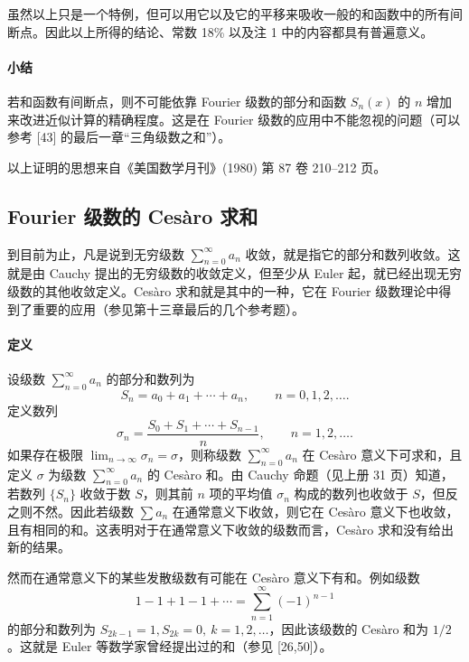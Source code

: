 \begin{xremark}
虽然以上只是一个特例，但可以用它以及它的平移来吸收一般的和函数中的所有间断点。因此以上所得的结论、常数 18\% 以及注 1 中的内容都具有普遍意义。
\end{xremark}

\paragraph{小结}
若和函数有间断点，则不可能依靠 Fourier 级数的部分和函数 $S_n(x)$ 的 $n$ 增加来改进近似计算的精确程度。这是在 Fourier 级数的应用中不能忽视的问题（可以参考 [43] 的最后一章“三角级数之和”）。

\begin{xremark}
以上证明的思想来自《美国数学月刊》(1980) 第 87 卷 210--212 页。
\end{xremark}

\subsection{Fourier 级数的 Cesàro 求和}

到目前为止，凡是说到无穷级数 $\sum_{n=0}^{\infty}a_n$ 收敛，就是指它的部分和数列收敛。这就是由 Cauchy 提出的无穷级数的收敛定义，但至少从 Euler 起，就已经出现无穷级数的其他收敛定义。Cesàro 求和就是其中的一种，它在 Fourier 级数理论中得到了重要的应用（参见第十三章最后的几个参考题）。

\paragraph{定义}
设级数 $\sum_{n=0}^{\infty}a_n$ 的部分和数列为
\[
  S_n=a_0+a_1+\cdots+a_n,\qquad n=0,1,2,\ldots.
\]
定义数列
\[
  \sigma_n=\frac{S_0+S_1+\cdots+S_{n-1}}{n},\qquad n=1,2,\ldots.
\]
如果存在极限 $\lim_{n\to\infty}\sigma_n=\sigma$，则称级数 $\sum_{n=0}^{\infty}a_n$ 在 Cesàro 意义下可求和，且定义 $\sigma$ 为级数 $\sum_{n=0}^{\infty}a_n$ 的 Cesàro 和。由 Cauchy 命题（见上册 31 页）知道，若数列 $\{S_n\}$ 收敛于数 $S$，则其前 $n$ 项的平均值 $\sigma_n$ 构成的数列也收敛于 $S$，但反之则不然。因此若级数 $\sum a_n$ 在通常意义下收敛，则它在 Cesàro 意义下也收敛，且有相同的和。这表明对于在通常意义下收敛的级数而言，Cesàro 求和没有给出新的结果。

然而在通常意义下的某些发散级数有可能在 Cesàro 意义下有和。例如级数
\[
  1-1+1-1+\cdots=\sum_{n=1}^{\infty}(-1)^{n-1}
\]
的部分和数列为 $S_{2k-1}=1,S_{2k}=0,\ k=1,2,\ldots$，因此该级数的 Cesàro 和为 $1/2$。这就是 Euler 等数学家曾经提出过的和（参见 [26,50]）。

